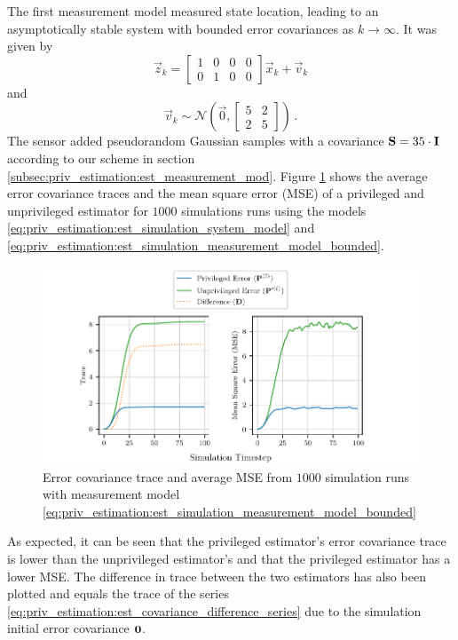 The first measurement model measured state location, leading to an asymptotically stable system with bounded error covariances as $k \rightarrow \infty$. It was given by 
\begin{equation}\label{eq:priv_estimation:est_simulation_measurement_model_bounded}
    \vec{z}_k=
    \begin{bmatrix}
        1 & 0 & 0 & 0\\
        0 & 1 & 0 & 0
    \end{bmatrix}
    \vec{x}_k + \vec{v}_k
\end{equation}
and
\begin{equation}
    \vec{v}_k \sim \mathcal{N}\left(\vec{0},
    \begin{bmatrix}
        5 & 2\\
        2 & 5
    \end{bmatrix}\right)\,.
\end{equation}
The sensor added pseudorandom Gaussian samples with a covariance ${{\mathbf{S}}}=35 \cdot {\ensuremath{{\mathbf{I}}}}$ according to our scheme in section \ref{subsec:priv_estimation:est_measurement_mod}. Figure \ref{fig:priv_estimation:est_sim_bounded} shows the average error covariance traces and the mean square error (MSE) of a privileged and unprivileged estimator for $1000$ simulations runs using the models \eqref{eq:priv_estimation:est_simulation_system_model} and \eqref{eq:priv_estimation:est_simulation_measurement_model_bounded}. 
\begin{figure}[htbp]
    \centering
    \includegraphics{figures/priv_estimation_est_sim_bounded.pdf}
    \caption{Error covariance trace and average MSE from $1000$ simulation runs with measurement model \eqref{eq:priv_estimation:est_simulation_measurement_model_bounded}}
    \label{fig:priv_estimation:est_sim_bounded}
\end{figure}
As expected, it can be seen that the privileged estimator's error covariance trace is lower than the unprivileged estimator's and that the privileged estimator has a lower MSE. The difference in trace between the two estimators has also been plotted and equals the trace of the series \eqref{eq:priv_estimation:est_covariance_difference_series} due to the simulation initial error covariance ${{\mathbf{0}}}$.


